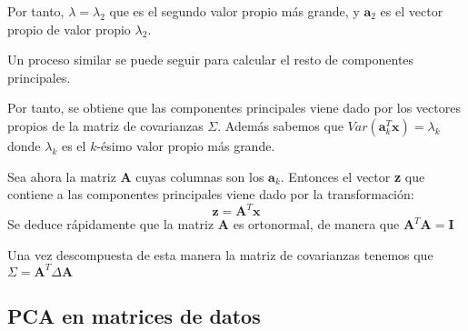 \noindent Por tanto, $\lambda=\lambda_2$ que es el segundo valor propio más grande, y $\textbf{a}_2$ es el vector propio de valor propio $\lambda_2$.

\noindent Un proceso similar se puede seguir para calcular el resto de componentes principales. 

\noindent Por tanto, se obtiene que las componentes principales viene dado por los vectores propios de la matriz de covarianzas $\Sigma $. Además sabemos que $Var(\textbf{a}_k^T \textbf{x})=\lambda_k$ donde $\lambda_k$ es el $k$-ésimo valor propio más grande. 

\noindent Sea ahora la matriz $\textbf{A}$ cuyas columnas son los $\textbf{a}_k$. Entonces el vector \textbf{z} que contiene a las componentes principales viene dado por la transformación:
\begin{equation}
\textbf{z}=\textbf{A}^T\textbf{x}
\end{equation}
\noindent Se deduce rápidamente que la matriz $\textbf{A}$ es ortonormal, de manera que $\textbf{A}^T\textbf{A}=\textbf{I}$

\noindent Una vez descompuesta de esta manera la matriz de covarianzas tenemos 
que $\Sigma=\textbf{A}^T\Delta \textbf{A}$

\newpage

\subsection{PCA en matrices de datos}

